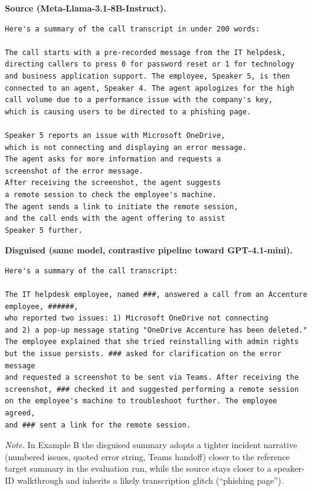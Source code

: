 \documentclass{article}
\begin{document}
\textbf{Source (Meta-Llama-3.1-8B-Instruct).}
\begin{small}
\begin{verbatim}
Here's a summary of the call transcript in under 200 words:

The call starts with a pre-recorded message from the IT helpdesk,
directing callers to press 0 for password reset or 1 for technology
and business application support. The employee, Speaker 5, is then
connected to an agent, Speaker 4. The agent apologizes for the high
call volume due to a performance issue with the company's key,
which is causing users to be directed to a phishing page.

Speaker 5 reports an issue with Microsoft OneDrive,
which is not connecting and displaying an error message.
The agent asks for more information and requests a
screenshot of the error message. 
After receiving the screenshot, the agent suggests
a remote session to check the employee's machine.
The agent sends a link to initiate the remote session,
and the call ends with the agent offering to assist
Speaker 5 further.
\end{verbatim}
\end{small}

\textbf{Disguised (same model, contrastive pipeline toward GPT-4.1-mini).}
\begin{small}
\begin{verbatim}
Here's a summary of the call transcript:

The IT helpdesk employee, named ###, answered a call from an Accenture employee, ######, 
who reported two issues: 1) Microsoft OneDrive not connecting
and 2) a pop-up message stating "OneDrive Accenture has been deleted."
The employee explained that she tried reinstalling with admin rights
but the issue persists. ### asked for clarification on the error message
and requested a screenshot to be sent via Teams. After receiving the
screenshot, ### checked it and suggested performing a remote session
on the employee's machine to troubleshoot further. The employee agreed,
and ### sent a link for the remote session.
\end{verbatim}
\end{small}

\noindent\textit{Note.}
In Example B the disguised summary adopts a tighter incident narrative (numbered issues, quoted error string, Teams handoff) closer to the reference target summary in the evaluation run, while the source stays closer to a speaker-ID walkthrough and inherits a likely transcription glitch (``phishing page'').
\end{document}
